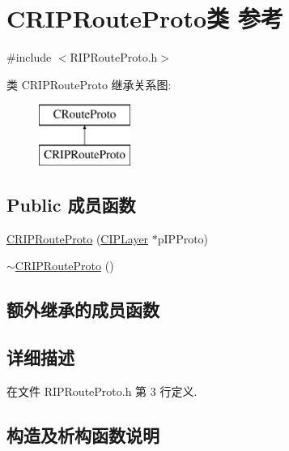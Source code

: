 \hypertarget{class_c_r_i_p_route_proto}{}\section{C\+R\+I\+P\+Route\+Proto类 参考}
\label{class_c_r_i_p_route_proto}


{\ttfamily \#include $<$R\+I\+P\+Route\+Proto.\+h$>$}

类 C\+R\+I\+P\+Route\+Proto 继承关系图\+:\begin{figure}[H]
\begin{center}
\leavevmode
\includegraphics[height=2.000000cm]{class_c_r_i_p_route_proto}
\end{center}
\end{figure}
\subsection*{Public 成员函数}
\begin{DoxyCompactItemize}
\item 
\hyperlink{class_c_r_i_p_route_proto_a75e098dbb570322ad14aba1ea6e06adb}{C\+R\+I\+P\+Route\+Proto} (\hyperlink{class_c_i_p_layer}{C\+I\+P\+Layer} $\ast$p\+I\+P\+Proto)
\item 
\hyperlink{class_c_r_i_p_route_proto_a848505ec34b13a32ac16444f45200138}{$\sim$\+C\+R\+I\+P\+Route\+Proto} ()
\end{DoxyCompactItemize}
\subsection*{额外继承的成员函数}


\subsection{详细描述}


在文件 R\+I\+P\+Route\+Proto.\+h 第 3 行定义.



\subsection{构造及析构函数说明}
\mbox{\label{class_c_r_i_p_route_proto_a75e098dbb570322ad14aba1ea6e06adb}} 
